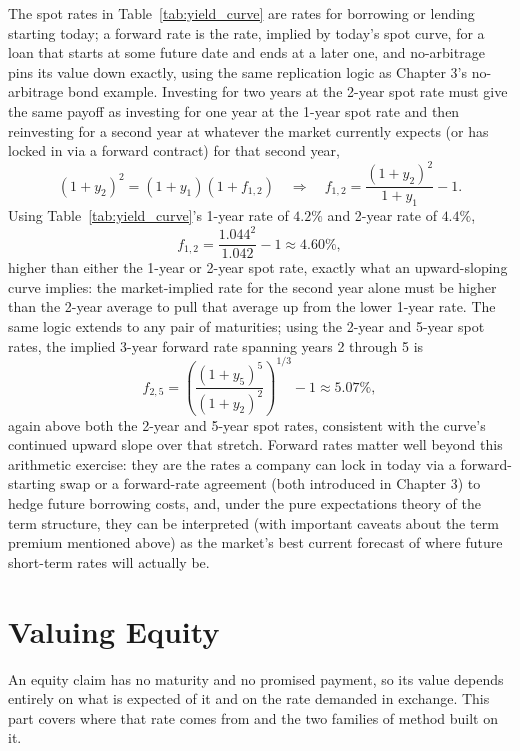 \documentclass[../ai_in_finance]{subfiles}
\begin{document}
The spot rates in Table~\ref{tab:yield_curve} are rates for borrowing or lending starting today; a forward rate is the rate, implied by today's spot curve, for a loan that starts at some future date and ends at a later one, and no-arbitrage pins its value down exactly, using the same replication logic as Chapter 3's no-arbitrage bond example. Investing for two years at the 2-year spot rate must give the same payoff as investing for one year at the 1-year spot rate and then reinvesting for a second year at whatever the market currently expects (or has locked in via a forward contract) for that second year,
\begin{equation*}
(1+y_2)^2 = (1+y_1)(1+f_{1,2}) \quad\Longrightarrow\quad f_{1,2} = \frac{(1+y_2)^2}{1+y_1} - 1.
\end{equation*}
Using Table~\ref{tab:yield_curve}'s 1-year rate of $4.2\%$ and 2-year rate of $4.4\%$,
\begin{equation*}
f_{1,2} = \frac{1.044^2}{1.042} - 1 \approx 4.60\%,
\end{equation*}
higher than either the 1-year or 2-year spot rate, exactly what an upward-sloping curve implies: the market-implied rate for the second year alone must be higher than the 2-year average to pull that average up from the lower 1-year rate. The same logic extends to any pair of maturities; using the 2-year and 5-year spot rates, the implied 3-year forward rate spanning years 2 through 5 is
\begin{equation*}
f_{2,5} = \left(\frac{(1+y_5)^5}{(1+y_2)^2}\right)^{1/3} - 1 \approx 5.07\%,
\end{equation*}
again above both the 2-year and 5-year spot rates, consistent with the curve's continued upward slope over that stretch. Forward rates matter well beyond this arithmetic exercise: they are the rates a company can lock in today via a forward-starting swap or a forward-rate agreement (both introduced in Chapter 3) to hedge future borrowing costs, and, under the pure expectations theory of the term structure, they can be interpreted (with important caveats about the term premium mentioned above) as the market's best current forecast of where future short-term rates will actually be.

\section{Valuing Equity}

An equity claim has no maturity and no promised payment, so its value depends entirely on what is expected of it and on the rate demanded in exchange. This part covers where that rate comes from and the two families of method built on it.
\end{document}

